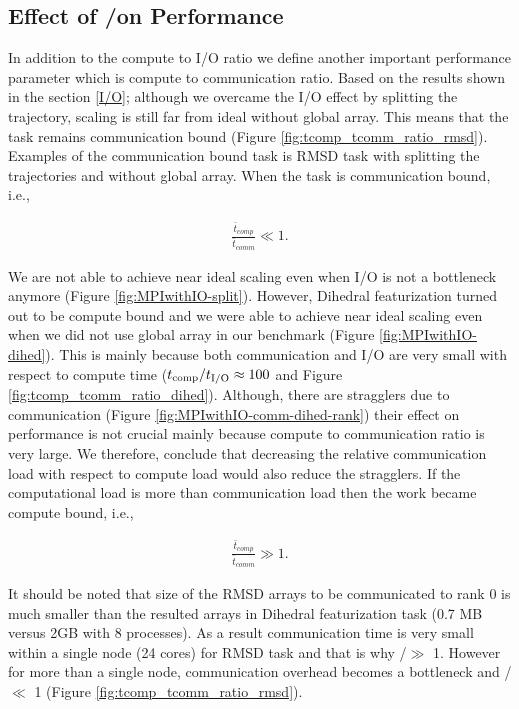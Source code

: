 \subsection{Effect of \tcomp/\tcomm on Performance}

In addition to the compute to I/O ratio we define another important performance parameter which is compute to communication ratio.
Based on the results shown in the section \ref{I/O}; although we overcame the I/O effect by splitting the trajectory, scaling is still far from ideal without global array.
This means that the task remains communication bound (Figure \ref{fig:tcomp_tcomm_ratio_rmsd}). 
Examples of the communication bound task is RMSD task with splitting the trajectories and without global array.
When the task is communication bound, i.e.,

\begin{gather*}
  \frac{\bar{t}_{comp}}{\bar{t}_{comm}} \ll 1.
\end{gather*}

We are not able to achieve near ideal scaling even when I/O is not a bottleneck anymore (Figure \ref{fig:MPIwithIO-split}).
However, Dihedral featurization turned out to be compute bound and we were able to achieve near ideal scaling even when we did not use global array in our benchmark (Figure \ref{fig:MPIwithIO-dihed}).
This is mainly because both communication and I/O are very small with respect to compute time (${t}_{\text{comp}}/{t}_{\text{I/O}} \approx 100$ and Figure \ref{fig:tcomp_tcomm_ratio_dihed}). 
Although, there are stragglers due to communication (Figure \ref{fig:MPIwithIO-comm-dihed-rank}) their effect on performance is not crucial mainly because compute to communication ratio is very large. 
We therefore, conclude that decreasing the relative communication load with respect to compute load would also reduce the stragglers. 
If the computational load is more than communication load then the work became compute bound, i.e.,

\begin{gather*}
  \frac{\bar{t}_{comp}}{\bar{t}_{comm}} \gg 1.
\end{gather*}

It should be noted that size of the RMSD arrays to be communicated to rank 0 is much smaller than the resulted arrays in Dihedral featurization task (0.7 MB versus 2GB with 8 processes).
As a result communication time is very small within a single node (24 cores) for RMSD task and that is why \tcomp/\tcomm $\gg$ 1.
However for more than a single node, communication overhead becomes a bottleneck and \tcomp/\tcomm $\ll$ 1 (Figure \ref{fig:tcomp_tcomm_ratio_rmsd}).

